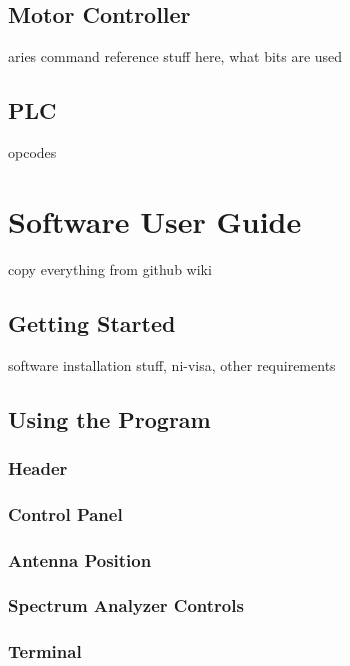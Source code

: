 \documentclass[titlepage]{article}
\begin{document}
\subsection{Motor Controller}
aries command reference stuff here, what bits are used
\subsection{PLC}
opcodes

\section{Software User Guide}
copy everything from github wiki
\subsection{Getting Started}
software installation stuff, ni-visa, other requirements
\subsection{Using the Program}
\subsubsection{Header}
\subsubsection{Control Panel}
\subsubsection{Antenna Position}
\subsubsection{Spectrum Analyzer Controls}
\subsubsection{Terminal}
\end{document}
